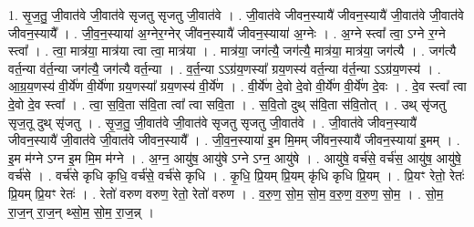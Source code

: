 \documentclass[17pt]{extarticle}
\begin{document}
1. सृ॒ज॒तु॒ जी॒वात॑वे जी॒वात॑वे सृजतु सृजतु जी॒वात॑वे । . जी॒वात॑वे जीवन॒स्यायै॑ जीवन॒स्यायै॑ जी॒वात॑वे जी॒वात॑वे जीवन॒स्यायै᳚ । . जी॒व॒न॒स्याया॑ अ॒ग्नेर॒ग्नेर् जी॑वन॒स्यायै॑ जीवन॒स्याया॑ अ॒ग्नेः । . अ॒ग्ने स्त्वा᳚ त्वा॒ ऽग्ने र॒ग्ने स्त्वा᳚ । . त्वा॒ मात्र॑या॒ मात्र॑या त्वा त्वा॒ मात्र॑या । . मात्र॑या॒ जग॑त्यै॒ जग॑त्यै॒ मात्र॑या॒ मात्र॑या॒ जग॑त्यै । . जग॑त्यै वर्त॒न्या व॑र्त॒न्या जग॑त्यै॒ जग॑त्यै वर्त॒न्या । . व॒र्त॒न्या ऽऽग्र॑य॒णस्या᳚ ग्रय॒णस्य॑ वर्त॒न्या व॑र्त॒न्या ऽऽग्र॑य॒णस्य॑ । . आ॒ग्र॒य॒णस्य॑ वी॒र्ये॑ण वी॒र्ये॑णा ग्रय॒णस्या᳚ ग्रय॒णस्य॑ वी॒र्ये॑ण । . वी॒र्ये॑ण दे॒वो दे॒वो वी॒र्ये॑ण वी॒र्ये॑ण दे॒वः । . दे॒व स्त्वा᳚ त्वा दे॒वो दे॒व स्त्वा᳚ । . त्वा॒ स॒वि॒ता स॑वि॒ता त्वा᳚ त्वा सवि॒ता । . स॒वि॒तो दुथ् स॑वि॒ता स॑वि॒तोत् । . उथ् सृ॑जतु सृज॒तू दुथ् सृ॑जतु । . सृ॒ज॒तु॒ जी॒वात॑वे जी॒वात॑वे सृजतु सृजतु जी॒वात॑वे । . जी॒वात॑वे जीवन॒स्यायै॑ जीवन॒स्यायै॑ जी॒वात॑वे जी॒वात॑वे जीवन॒स्यायै᳚ । . जी॒व॒न॒स्याया॑ इ॒म मि॒मम् जी॑वन॒स्यायै॑ जीवन॒स्याया॑ इ॒मम् । . इ॒म म॑ग्ने ऽग्न इ॒म मि॒म म॑ग्ने । . अ॒ग्न॒ आयु॑ष॒ आयु॑षे ऽग्ने ऽग्न॒ आयु॑षे । . आयु॑षे॒ वर्च॑से॒ वर्च॑स॒ आयु॑ष॒ आयु॑षे॒ वर्च॑से । . वर्च॑से कृधि कृधि॒ वर्च॑से॒ वर्च॑से कृधि । . कृ॒धि॒ प्रि॒यम् प्रि॒यम् कृ॑धि कृधि प्रि॒यम् । . प्रि॒यꣳ रेतो॒ रेतः॑ प्रि॒यम् प्रि॒यꣳ रेतः॑ । . रेतो॑ वरुण वरुण॒ रेतो॒ रेतो॑ वरुण । . व॒रु॒ण॒ सो॒म॒ सो॒म॒ व॒रु॒ण॒ व॒रु॒ण॒ सो॒म॒ । . सो॒म॒ रा॒ज॒न् रा॒ज॒न् थ्सो॒म॒ सो॒म॒ रा॒ज॒न्न् । \newline
\end{document}
